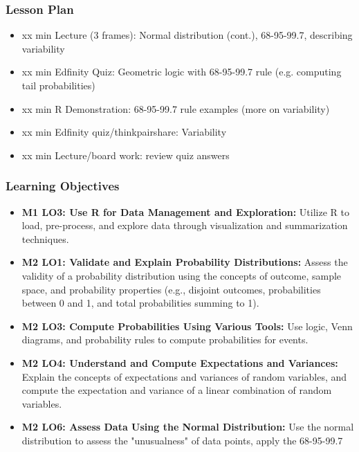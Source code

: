 \begin{frame}
    \frametitle{Lesson Plan}
    \begin{itemize}
        \item xx min Lecture (3 frames): Normal distribution (cont.), 68-95-99.7, describing variability
        \item xx min Edfinity Quiz: Geometric logic with 68-95-99.7 rule (e.g. computing tail probabilities)
        \item xx min R Demonstration: 68-95-99.7 rule examples (more on variability)
        \item xx min Edfinity quiz/thinkpairshare: Variability
        \item xx min Lecture/board work: review quiz answers
    \end{itemize}
\end{frame}

\begin{frame}
    \frametitle{Learning Objectives}
    \begin{itemize}
        \item \textbf{M1 LO3: Use R for Data Management and Exploration:} Utilize R to load, pre-process, and explore data through visualization and summarization techniques.
        \item \textbf{M2 LO1: Validate and Explain Probability Distributions:} Assess the validity of a probability distribution using the concepts of outcome, sample space, and probability properties (e.g., disjoint outcomes, probabilities between 0 and 1, and total probabilities summing to 1).
        \item \textbf{M2 LO3: Compute Probabilities Using Various Tools:} Use logic, Venn diagrams, and probability rules to compute probabilities for events.
        \item \textbf{M2 LO4: Understand and Compute Expectations and Variances:} Explain the concepts of expectations and variances of random variables, and compute the expectation and variance of a linear combination of random variables.
        \item \textbf{M2 LO6: Assess Data Using the Normal Distribution:} Use the normal distribution to assess the "unusualness" of data points, apply the 68-95-99.7%
    \end{itemize}
\end{frame}


